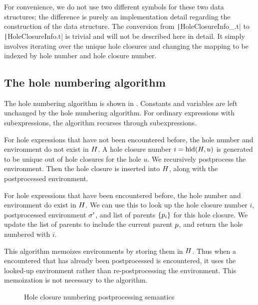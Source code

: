 For convenience, we do not use two different symbols for these two data structures; the difference is purely an implementation detail regarding the construction of the data structure. The conversion from \texttt|HoleClosureInfo_.t| to \texttt|HoleClosureInfo.t| is trivial and will not be described here in detail. It simply involves iterating over the unique hole closures and changing the mapping to be indexed by hole number and hole closure number.

\subsection{The hole numbering algorithm}
\label{sec:hole-numbering-algorithm}

The hole numbering algorithm is shown in . Constants and variables are left unchanged by the hole numbering algorithm. For ordinary expressions with subexpressions, the algorithm recurses through subexpressions.

For hole expressions that have not been encountered before, the hole number and environment do not exist in $H$. A hole closure number $i=\operatorname{hid}(H,u)$ is generated to be unique out of hole closures for the hole $u$. We recursively postprocess the environment. Then the hole closure is inserted into $H$, along with the postprocessed environment.

For hole expressions that have been encountered before, the hole number and environment do exist in $H$. We can use this to look up the hole closure number $i$, postprocessed environment $\sigma'$, and list of parents $\{p_i\}$ for this hole closure. We update the list of parents to include the current parent $p$, and return the hole numbered with $i$.

This algorithm memoizes environments by storing them in $H$. Thus when a encountered that has already been postprocessed is encountered, it uses the looked-up environment rather than re-postprocessing the environment. This memoization is not necessary to the algorithm.

\begin{figure}
  \centering
  \begin{mdframed}
    \begin{singlespace}
      
    \end{singlespace}
  \end{mdframed}
  \caption{Hole closure numbering postprocessing semantics}
  \label{fig:big-step-renumber-new-rules}
\end{figure}

